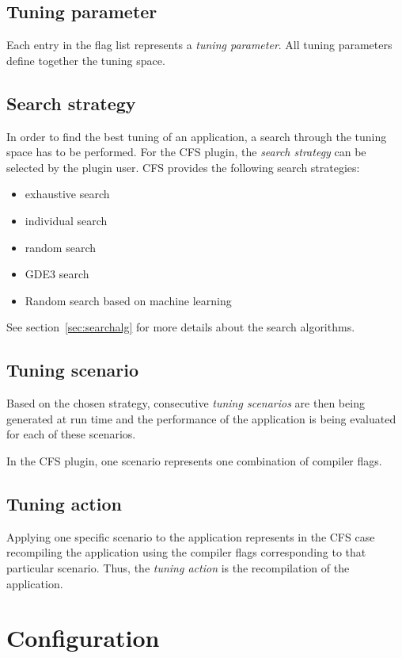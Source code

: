 \documentclass[11pt,a4paper, oneside]{book} %
\begin{document}
\section{Tuning parameter}
Each entry in the flag list represents a \textit{tuning parameter}. All tuning parameters define together the tuning space.

\section{Search strategy}
In order to find the best tuning of an application, a search through the tuning space has to be performed.
For the CFS plugin, the \textit{search strategy} can be selected by the plugin user. CFS provides the following search strategies:
\begin{itemize}
	\item exhaustive search
	\item individual search
    \item random search
    \item GDE3 search
    \item Random search based on machine learning
\end{itemize}

See section~\ref{sec:searchalg} for more details about the search algorithms.

\section{Tuning scenario}

Based on the chosen strategy, consecutive \textit{tuning scenarios} are then being generated at run time and the performance of the application is being evaluated for each of these scenarios.

In the CFS plugin, one scenario represents one combination of compiler flags.

\section{Tuning action}

Applying one specific scenario to the application represents in the CFS case recompiling the application using the compiler flags corresponding to that particular scenario. Thus, the \textit{tuning action} is the recompilation of the application.


\chapter{Configuration}
\end{document}
